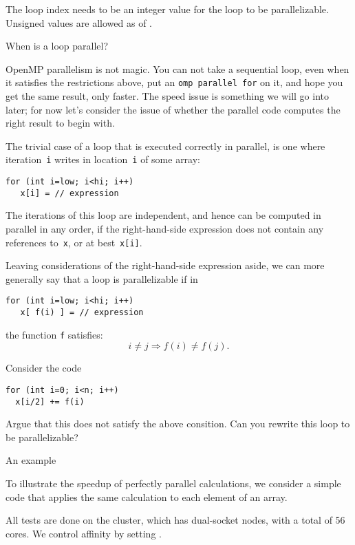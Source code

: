 \begin{remark}
  The loop index needs to be an integer value
  for the loop to be parallelizable.
  Unsigned values are allowed as of .
\end{remark}

 {When is a loop parallel?}

OpenMP parallelism is not magic. You can not take a sequential loop,
even when it satisfies the restrictions above,
put an \lstinline[language=omp]{omp parallel for} on it,
and hope you get the same result, only faster.
The speed issue is something we will go into later;
for now let's consider the issue of whether the parallel
code computes the right result to begin with.

The trivial case of a loop that is executed correctly in parallel,
is one where iteration~\lstinline{i} writes in location~\lstinline{i}
of some array:
\begin{lstlisting}[language=omp]
for (int i=low; i<hi; i++)
   x[i] = // expression
\end{lstlisting}
The iterations of this loop are independent,
and hence can be computed in parallel in any order,
if the right-hand-side expression does not contain
any references to~\lstinline{x},
or at best~\lstinline{x[i]}.

Leaving considerations of the right-hand-side expression aside,
we can more generally say that a loop is parallelizable if in
\begin{lstlisting}[language=omp]
for (int i=low; i<hi; i++)
   x[ f(i) ] = // expression
\end{lstlisting}
the function \lstinline{f} satisfies:
\[ i\not=j \Rightarrow f(i)\not=f(j). \]

\begin{exercise}
  \label{sl:omp:loop-over-2}
  Consider the code
  \begin{lstlisting}[language=omp]
for (int i=0; i<n; i++)
  x[i/2] += f(i)
\end{lstlisting}
  Argue that this does not satisfy the above consition.
  Can you rewrite this loop to be parallelizable?
\end{exercise}

 {An example}

To illustrate the speedup of perfectly parallel calculations,
we consider a simple code that applies the same calculation
to each element of an array.

All tests are done on the  cluster,
which has dual-socket  nodes,
with a total of 56 cores.
We control affinity by setting
.

